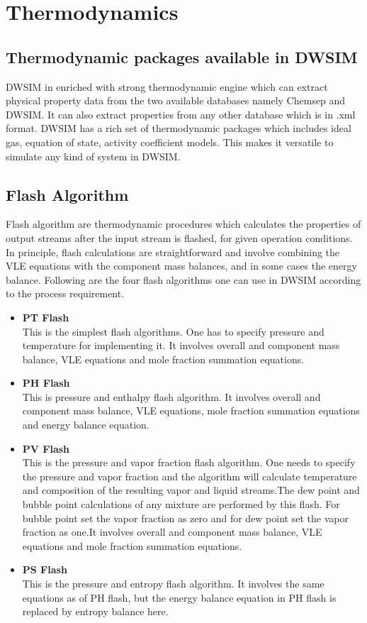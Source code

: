 \documentclass[12pt]{report}
\begin{document}
\section{Thermodynamics}
\subsection{Thermodynamic packages available in DWSIM}
DWSIM in enriched with strong thermodynamic engine which can extract physical property data from the two available databases namely Chemsep and DWSIM. It can also extract properties from any other database which is in .xml format. DWSIM has a rich set of thermodynamic packages which includes ideal gas, equation of state, activity coefficient models. This makes it versatile to simulate any kind of system in DWSIM.

\subsection{Flash Algorithm}
Flash algorithm are thermodynamic procedures which calculates the properties of output streams after the input stream is flashed, for given operation conditions. In principle, flash calculations are straightforward and involve combining the VLE equations with the component mass balances, and in some cases the energy balance. Following are the four flash algorithms one can use in DWSIM according to the process requirement.

\begin{itemize}
\item{\textbf{PT Flash}} \\
This is the simplest flash algorithms. One has to specify pressure and temperature for implementing it. It involves overall and component mass balance, VLE equations and mole fraction summation equations.
\item{\textbf{PH Flash}} \\
This is pressure and enthalpy flash algorithm. It involves overall and component mass balance, VLE equations, mole fraction summation equations and energy balance equation.
\item{\textbf{PV Flash}} \\
This is the pressure and vapor fraction flash algorithm. One needs to specify the pressure and vapor fraction and the algorithm will calculate temperature and composition of the resulting vapor and liquid streams.The dew point and bubble point calculations of any mixture are performed by this flash. For bubble point set the vapor fraction as zero and for dew point set the vapor fraction as one.It involves overall and component mass balance, VLE equations and mole fraction summation equations.
\item{\textbf{PS Flash}} \\
This is the pressure and entropy flash algorithm. It involves the same equations as of PH flash, but the energy balance equation in PH flash is replaced by entropy balance here.
\end{itemize}
\end{document}
